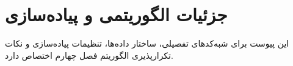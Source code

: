\chapter{جزئیات الگوریتمی و پیاده‌سازی}
\label{app:algo-details}

این پیوست برای شبه‌کدهای تفصیلی، ساختار داده‌ها، تنظیمات پیاده‌سازی و نکات تکرارپذیری الگوریتم فصل چهارم اختصاص دارد.
